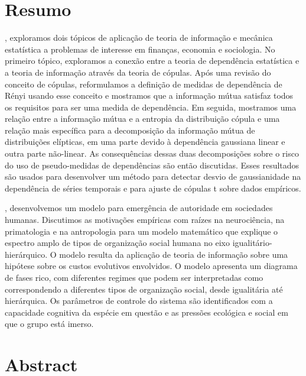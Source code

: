\chapter*{Resumo}
, exploramos dois tópicos de aplicação de teoria de informação e mecânica estatística a problemas de interesse em finanças, economia e sociologia. No primeiro tópico, exploramos a conexão entre a teoria de dependência estatística e a teoria de informação através da teoria de cópulas. Após uma revisão do conceito de cópulas, reformulamos a definição de medidas de dependência de Rényi\citep{Renyi1959} usando esse conceito e mostramos que a informação mútua satisfaz todos os requisitos para ser uma medida de dependência. Em seguida, mostramos uma relação entre a informação mútua e a entropia da distribuição cópula e uma relação mais específica para a decomposição da informação mútua de distribuições elípticas, em uma parte devido à dependência gaussiana linear e outra parte não-linear. As consequências dessas duas decomposições sobre o risco do uso de pseudo-medidas de dependências são então discutidas. Esses resultados são usados para desenvolver um método para detectar desvio de gaussianidade na dependência de séries temporais e para ajuste de cópulas t sobre dados empíricos\citep{Calsaverini2009}.

, desenvolvemos um modelo para emergência de autoridade em sociedades humanas. Discutimos as motivações empíricas com raízes na neurociência, na primatologia e na antropologia para um modelo matemático que explique o espectro amplo de tipos de organização social humana no eixo igualitário-hierárquico. O modelo resulta da aplicação de teoria de informação sobre uma hipótese sobre os custos evolutivos envolvidos. O modelo apresenta um diagrama de fases rico, com diferentes regimes que podem ser interpretadas como correspondendo a diferentes tipos de organização social, desde igualitária até hierárquica. Os parâmetros de controle do sistema são identificados com a capacidade cognitiva da espécie em questão e as pressões ecológica e social em que o grupo está imerso.

\chapter*{Abstract}
 
